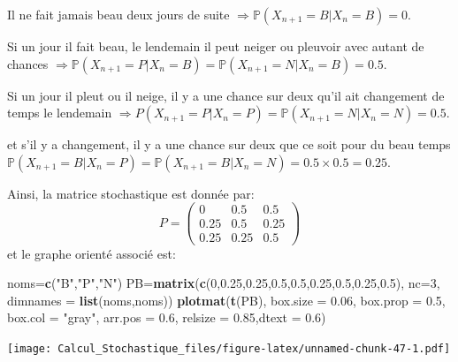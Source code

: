 \documentclass[
]{book}
\newenvironment{Shaded}{\begin{snugshade}}{\end{snugshade}}
\newcommand{\DataTypeTok}[1]{\textcolor[rgb]{0.13,0.29,0.53}{#1}}
\newcommand{\DecValTok}[1]{\textcolor[rgb]{0.00,0.00,0.81}{#1}}
\newcommand{\FloatTok}[1]{\textcolor[rgb]{0.00,0.00,0.81}{#1}}
\newcommand{\KeywordTok}[1]{\textcolor[rgb]{0.13,0.29,0.53}{\textbf{#1}}}
\newcommand{\NormalTok}[1]{#1}
\newcommand{\StringTok}[1]{\textcolor[rgb]{0.31,0.60,0.02}{#1}}
\theoremstyle{definition}
\theoremstyle{definition}
\theoremstyle{definition}
\theoremstyle{remark}
\begin{document}
Il ne fait jamais beau deux jours de suite \(\Longrightarrow \mathbb{P}(X_{n+1}=B|X_n=B)=0\).

Si un jour il fait beau, le lendemain il peut neiger ou pleuvoir avec autant de chances \(\Longrightarrow \mathbb{P}(X_{n+1}=P|X_n=B)=\mathbb{P}(X_{n+1}=N|X_n=B)=0.5\).

Si un jour il pleut ou il neige, il y a une chance sur deux qu'il ait changement de temps le lendemain \(\Longrightarrow P(X_{n+1}=P|X_n=P)=\mathbb{P}(X_{n+1}=N|X_n=N)=0.5\).

et s'il y a changement, il y a une chance sur deux que ce soit pour du beau temps \(\mathbb{P}(X_{n+1}=B|X_n=P)=\mathbb{P}(X_{n+1}=B|X_n=N)=0.5\times 0.5=0.25\).

Ainsi, la matrice stochastique est donnée par:
\[
  P=\left( 
  \begin{array}{ccc}
  0 & 0.5 & 0.5\\
  0.25 & 0.5 & 0.25\\
  0.25 & 0.25 & 0.5
  \end{array}
  \right)
  \]
et le graphe orienté associé est:

\begin{Shaded}
\begin{Highlighting}[]
\NormalTok{noms=}\KeywordTok{c}\NormalTok{(}\StringTok{"B"}\NormalTok{,}\StringTok{"P"}\NormalTok{,}\StringTok{"N"}\NormalTok{)}
\NormalTok{PB=}\KeywordTok{matrix}\NormalTok{(}\KeywordTok{c}\NormalTok{(}\DecValTok{0}\NormalTok{,}\FloatTok{0.25}\NormalTok{,}\FloatTok{0.25}\NormalTok{,}\FloatTok{0.5}\NormalTok{,}\FloatTok{0.5}\NormalTok{,}\FloatTok{0.25}\NormalTok{,}\FloatTok{0.5}\NormalTok{,}\FloatTok{0.25}\NormalTok{,}\FloatTok{0.5}\NormalTok{), }\DataTypeTok{nc=}\DecValTok{3}\NormalTok{,}
          \DataTypeTok{dimnames =} \KeywordTok{list}\NormalTok{(noms,noms))}
\KeywordTok{plotmat}\NormalTok{(}\KeywordTok{t}\NormalTok{(PB), }\DataTypeTok{box.size =} \FloatTok{0.06}\NormalTok{, }\DataTypeTok{box.prop =} \FloatTok{0.5}\NormalTok{, }\DataTypeTok{box.col =} \StringTok{"gray"}\NormalTok{, }
          \DataTypeTok{arr.pos =} \FloatTok{0.6}\NormalTok{, }\DataTypeTok{relsize =} \FloatTok{0.85}\NormalTok{,}\DataTypeTok{dtext =} \FloatTok{0.6}\NormalTok{)}
\end{Highlighting}
\end{Shaded}

\texttt{[image: Calcul\_Stochastique\_files/figure-latex/unnamed-chunk-47-1.pdf]}
\end{document}
